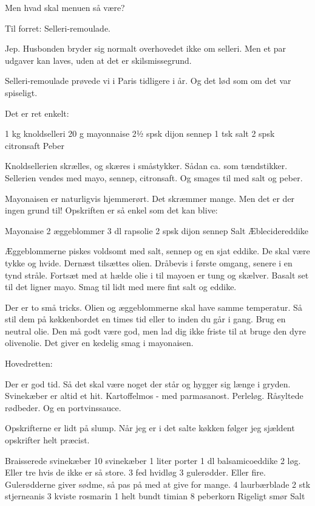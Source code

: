 \documentclass[
  letterpaper,
  DIV=11,
  numbers=noendperiod]{scrreprt}
\begin{document}
Men hvad skal menuen så være?

Til forret: Selleri-remoulade.

Jep. Husbonden bryder sig normalt overhovedet ikke om selleri. Men et
par udgaver kan laves, uden at det er skilsmissegrund.

Selleri-remoulade prøvede vi i Paris tidligere i år. Og det lød som om
det var spiseligt.

Det er ret enkelt:

1 kg knoldselleri 20 g mayonnaise 2½ spsk dijon sennep 1 tsk salt 2 spsk
citronsaft Peber

Knoldsellerien skrælles, og skæres i småstykker. Sådan ca. som
tændstikker. Sellerien vendes med mayo, sennep, citronsaft. Og smages
til med salt og peber.

Mayonaisen er naturligvis hjemmerørt. Det skræmmer mange. Men det er der
ingen grund til! Opskriften er så enkel som det kan blive:

Mayonaise 2 æggeblommer 3 dl rapsolie 2 spsk dijon sennep Salt
Æblecidereddike

Æggeblommerne piskes voldsomt med salt, sennep og en sjat eddike. De
skal være tykke og hvide. Dernæst tilsættes olien. Dråbevis i første
omgang, senere i en tynd stråle. Fortsæt med at hælde olie i til mayoen
er tung og skælver. Basalt set til det ligner mayo. Smag til lidt med
mere fint salt og eddike.

Der er to små tricks. Olien og æggeblommerne skal have samme temperatur.
Så stil dem på køkkenbordet en times tid eller to inden du går i gang.
Brug en neutral olie. Den må godt være god, men lad dig ikke friste til
at bruge den dyre olivenolie. Det giver en kedelig smag i mayonaisen.

Hovedretten:

Der er god tid. Så det skal være noget der står og hygger sig længe i
gryden. Svinekæber er altid et hit. Kartoffelmos - med parmasanost.
Perleløg. Råsyltede rødbeder. Og en portvinssauce.

Opskrifterne er lidt på slump. Når jeg er i det salte køkken følger jeg
sjældent opskrifter helt præcist.

Braisserede svinekæber 10 svinekæber 1 liter porter 1 dl balsamicoeddike
2 løg. Eller tre hvis de ikke er så store. 3 fed hvidløg 3 gulerødder.
Eller fire. Gulerødderne giver sødme, så pas på med at give for mange. 4
laurbærblade 2 stk stjerneanis 3 kviste rosmarin 1 helt bundt timian 8
peberkorn Rigeligt smør Salt
\end{document}
